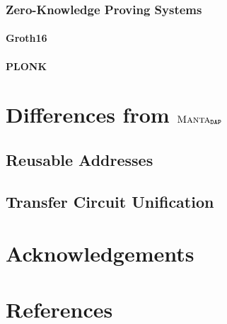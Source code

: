 \documentclass[a4paper]{article}
\newcommand{\subsubsubsection}[1]{\paragraph{#1}}
\newcommand{\lsection}[2]{\def\sectionlabel{#2} \section{#1}\label{sec:#2}}
\theoremstyle{definition}
\newcommand{\MantaDAP}{{\Manta{}_{\texttt{DAP}}}}
\newcommand{\Manta}{{\textsc{Manta}}}
\newcommand{\Transfer}{{\textsf{Transfer}}}
\begin{document}
\subsubsection{Zero-Knowledge Proving Systems}

\subsubsubsection{Groth16}

\subsubsubsection{PLONK}

\lsection{Differences from $\MantaDAP$}{differences}

\subsection{Reusable Addresses}

\subsection{\Transfer{} Circuit Unification}

\lsection{Acknowledgements}{acknowledgements}

\lsection{References}{references}
\end{document}
